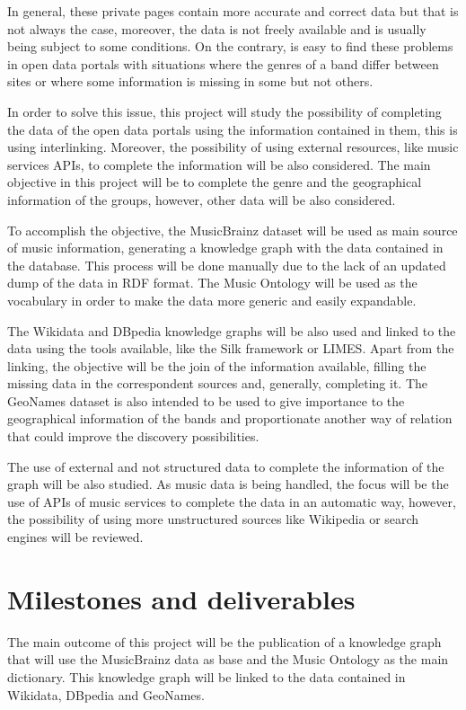 \documentclass[paper=a4,fontsize=11pt]{scrartcl}
\numberwithin{equation}{section}		%
\numberwithin{figure}{section}			%
\numberwithin{table}{section}				%
\begin{document}
In general, these private pages contain more accurate and correct data but that is not always the case, moreover, the data is not freely available and is usually being subject to some conditions.
On the contrary, is easy to find these problems in open data portals with situations where the genres of a band differ between sites or where some information is missing in some but not others. 

In order to solve this issue, this project will study the possibility of completing the data of the open data portals using the information contained in them, this is using interlinking.
Moreover, the possibility of using external resources, like music services APIs, to complete the information will be also considered. The main objective in this project will be to complete the genre and the geographical information of the groups, however, other data will be also considered.

To accomplish the objective, the MusicBrainz dataset will be used as main source of music information, generating a knowledge graph with the data contained in the database.
This process will be done manually due to the lack of an updated dump of the data in RDF format.
The Music Ontology \cite{music_ontology} will be used as the vocabulary in order to make the data more generic and easily expandable.

The Wikidata and DBpedia knowledge graphs will be also used and linked to the data using the tools available, like the Silk framework or LIMES. Apart from the linking, the objective will be the join of the information available, filling the missing data in the correspondent sources and, generally, completing it. The GeoNames \cite{geonames} dataset is also intended to be used to give importance to the geographical information of the bands and proportionate another way of relation that could improve the discovery possibilities.

The use of external and not structured data to complete the information of the graph will be also studied. As music data is being handled, the focus will be the use of APIs of music services to complete the data in an automatic way, however, the possibility of using more unstructured sources like Wikipedia or search engines will be reviewed.

\section{Milestones and deliverables}
The main outcome of this project will be the publication of a knowledge graph that will use the MusicBrainz data as base and the Music Ontology as the main dictionary.
This knowledge graph will be linked to the data contained in Wikidata, DBpedia and GeoNames.
\end{document}
